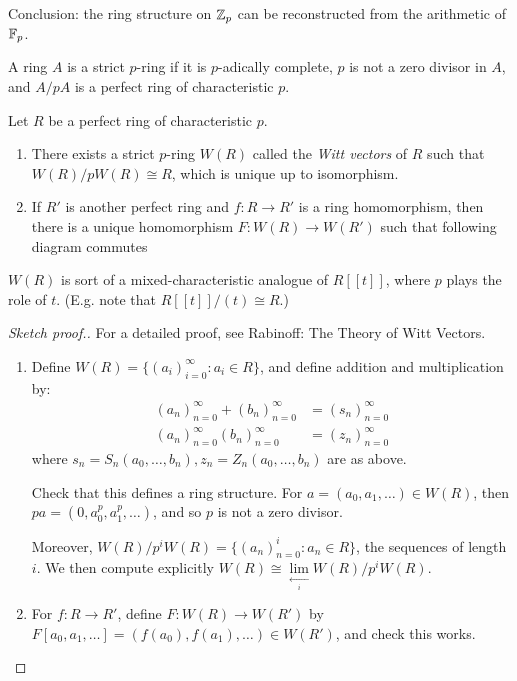 \documentclass[10pt,a4paper]{article}
\begin{document}
Conclusion: the ring structure on $\mathbb{Z}_p$ can be reconstructed from the arithmetic of $\mathbb{F}_p$.

\begin{definition}
  A ring $A$ is a strict $p$-ring if it is $p$-adically complete, $p$ is not a zero divisor in $A$, and $A/pA$ is a perfect ring of characteristic $p$.
\end{definition}
\begin{theorem}
  Let $R$ be a perfect ring of characteristic $p$.
  \begin{enumerate}
    \item There exists a strict $p$-ring $W(R)$ called the \emph{Witt vectors} of $R$ such that $W(R)/pW(R) \cong R$, which is unique up to isomorphism.
    \item If $R'$ is another perfect ring and $f:R\to R'$ is a ring homomorphism, then there is a unique homomorphism $F:W(R)\to W(R')$ such that following diagram commutes
    \begin{center}
    \end{center}
  \end{enumerate}
\end{theorem}
$W(R)$ is sort of a mixed-characteristic analogue of $R[[t]]$, where $p$ plays the role of $t$. (E.g. note that $R[[t]]/(t) \cong R$.)
\begin{proof}[Sketch proof.]
  For a detailed proof, see Rabinoff: The Theory of Witt Vectors.

  \begin{enumerate}[label=\textit{\arabic*.}]
    \item Define $W(R) = \{ (a_i)_{i=0}^\infty : a_i \in R\}$, and define addition and multiplication by:
    \begin{align*}
      (a_n)_{n=0}^\infty + (b_n)_{n=0}^\infty &= (s_n)_{n=0}^\infty\\
      (a_n)_{n=0}^\infty (b_n)_{n=0}^\infty &= (z_n)_{n=0}^\infty
    \end{align*}
    where $s_n = S_n(a_0, \ldots, b_n), z_n = Z_n(a_0, \ldots, b_n)$ are as above.

    Check that this defines a ring structure. For $a = (a_0, a_1, \ldots) \in W(R)$, then $pa = (0, a_0^p, a_1^p, \ldots)$, and so $p$ is not a zero divisor.

    Moreover, $W(R)/p^iW(R) = \{(a_n)_{n=0}^{i}:a_n \in R\}$, the sequences of length $i$. We then compute explicitly $W(R) \cong \lim\limits_{\xleftarrow[i]{}}W(R)/p^iW(R)$.

    \item For $f: R\to R'$, define $F:W(R)\to W(R')$ by $F[a_0, a_1, \ldots] = (f(a_0), f(a_1), \ldots) \in W(R')$, and check this works.
  \end{enumerate}
\end{proof}
\end{document}
